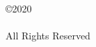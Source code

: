 \setcounter{page}{2}

\vspace*{6.6in}
\begin{center}
  \copyright 2020\\
  \myname\\
  All Rights Reserved
\end{center}
